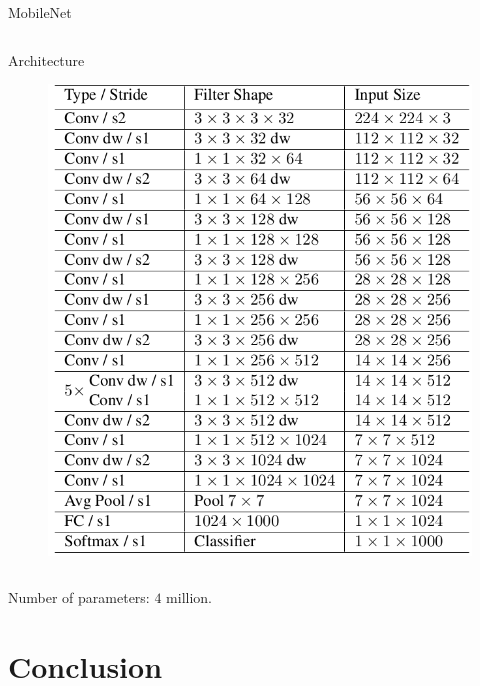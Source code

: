 \documentclass[xcolor=pdftex,dvipsnames,table,mathserif]{beamer}
\begin{document}
\begin{frame}{MobileNet \cite{howard_mobilenets:_2017}}
\begin{columns}
    \begin{column}{.5\textwidth}
      \begin{block}{Architecture}
        \begin{figure}[ht]
          \centering
          \includegraphics[width=\textwidth]{mobilenet}
        \end{figure}

      \end{block}
    \end{column}
  \end{columns}

  Number of parameters: $4$  million.

\end{frame}


\section{Conclusion}


\end{document}
